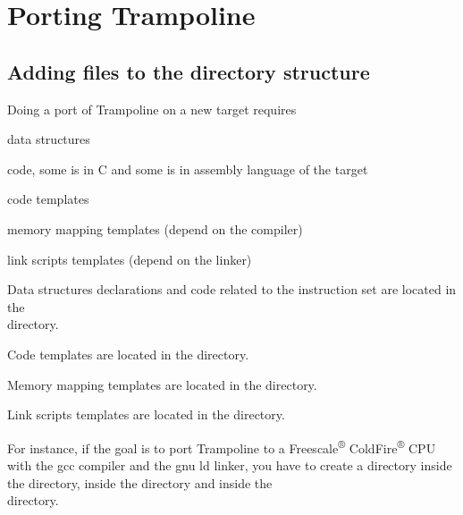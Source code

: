 
\chapter{Porting Trampoline}


\section{Adding files to the directory structure}

Doing a port of Trampoline on a new target requires

\begin{pitemize}
\item data structures
\item code, some is in C and some is in assembly language of the target
\item code templates
\item memory mapping templates (depend on the compiler)
\item link scripts templates (depend on the linker)
\end{pitemize}

Data structures declarations and code related to the instruction set are located in the\\  directory. 

Code templates are located in the  directory.

Memory mapping templates are located in the  directory.

Link scripts templates are located in the  directory.

For instance, if the goal is to port Trampoline to a Freescale\textsuperscript{®} ColdFire\textsuperscript{®} CPU with the gcc compiler and the gnu ld linker, you have to create a directory  inside the  directory, inside the  directory and inside the\\  directory. 

